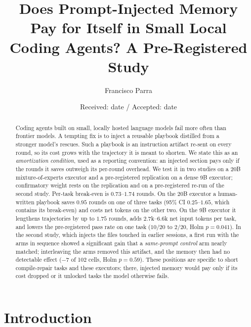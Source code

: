 \documentclass[smallcondensed,natbib]{svjour3}
\title{Does Prompt-Injected Memory Pay for Itself in Small Local Coding
Agents? A Pre-Registered Study}
\author{Francisco Parra}
\institute{F. Parra \at
  Departamento de Ingenier\'ia Inform\'atica, Universidad de Santiago de
  Chile, Santiago, Chile \\
  \email{francisco.parra.o@usach.cl}
}
\date{Received: date / Accepted: date}
\begin{document}
\maketitle

\begin{abstract}
Coding agents built on small, locally hosted language models fail more
often than frontier models. A tempting fix is to inject a reusable
playbook distilled from a stronger model's rescues. Such a playbook is
an instruction artifact re-sent on every round, so its cost grows with
the trajectory it is meant to shorten. We state this as an \emph{amortization condition},
used as a reporting convention: an injected section pays only if the
rounds it saves outweigh its per-round overhead. We test it in two
studies on a 20B mixture-of-experts executor and a pre-registered
replication on a dense 9B executor; confirmatory weight rests on the
replication and on a pre-registered re-run of the second study. Per-task break-even is $0.73$--$1.74$ rounds. On the 20B
executor a human-written playbook saves $0.95$ rounds on one of three
tasks (95\% CI $0.25$--$1.65$, which contains its break-even) and costs
net tokens on the other two. On the 9B executor it lengthens
trajectories by up to $1.75$ rounds, adds $2.7$k--$6.6$k net input
tokens per task, and lowers the pre-registered pass rate on one task
($10/20$ to $2/20$, Holm $p=0.041$). In the second study, which injects
the files touched in earlier sessions, a first run with the arms in
sequence showed a significant gain that a \emph{same-prompt control}
arm nearly matched; interleaving the arms removed this artifact, and
the memory then had no detectable effect ($-7$ of 102 cells, Holm
$p=0.59$). These positions are specific to short compile-repair tasks
and these executors; there, injected memory would pay only if its cost
dropped or it unlocked tasks the model otherwise fails.
\end{abstract}

\section{Introduction}\label{sec:intro}
\end{document}
